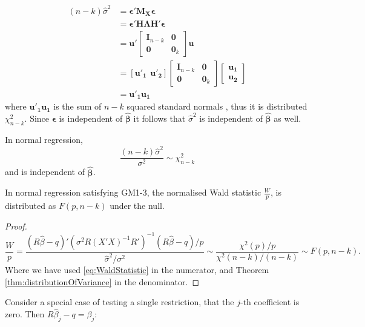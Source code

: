 \documentclass[DIV=14,titlepage=false]{scrreprt}
\begin{document}
\begin{align*}
    (n-k)\hat\sigma^2 &= \boldsymbol{\epsilon}'\mathbf{M_X} \boldsymbol{\epsilon}\\
    &= \boldsymbol{\epsilon}' \mathbf{H}\mathbf{\Lambda} \mathbf{H'} \boldsymbol{\epsilon}\\
    &= \mathbf{u}' \begin{bmatrix}
        \mathbf{I}_{n-k} & \mathbf{0} \\
        \mathbf{0} & \mathbf{0}_k
        \end{bmatrix} \mathbf{u}\\
    &= [\mathbf{u'_1} \hspace{5pt} \mathbf{u'_2}] \begin{bmatrix}
        \mathbf{I}_{n-k} & \mathbf{0} \\
        \mathbf{0} & \mathbf{0}_k
        \end{bmatrix} \begin{bmatrix}
            \mathbf{u_1}\\
            \mathbf{u_2}
        \end{bmatrix}\\
    &=\mathbf{u'_1} \mathbf{u_1}
\end{align*}
where $\mathbf{u'_1} \mathbf{u_1}$ is the sum of $n-k$ squared standard normals , thus it is distributed $\chi^2_{n-k}$. Since $\boldsymbol{\epsilon}$ is independent of $\boldsymbol{\hat\beta}$ it follows that $\hat\sigma^2$ is independent of $\boldsymbol{\hat\beta}$ as well.
\begin{theorem} 
In normal regression, \[\frac{(n-k)\hat\sigma^2}{\sigma^2}\sim\chi^2_{n-k}\] and is independent of $\boldsymbol{\hat\beta}$.
\label{thm:distributionOfVariance}
\end{theorem}
\begin{corollary}
    In normal regression satisfying GM1-3, the normalised Wald statistic $\frac{W}{p}$, is distributed as $F(p,n-k)$ under the null.
\end{corollary}
\begin{proof}
    \[
\frac{W}{p} = \frac{(R \hat\beta-q)'(\sigma^2R(X'X)^{-1}R')^{-1}(R \hat\beta-q)/p}{\hat\sigma^2/\sigma^2} \sim \frac{\chi^2(p)/p}{\chi^2(n - k)/(n - k)} \sim F(p, n - k).
\]
Where we have used \ref{eq:WaldStatistic} in the numerator, and Theorem \ref{thm:distributionOfVariance} in the denominator.
\end{proof}
Consider a special case of testing a single restriction, that the $j$-th coefficient is zero. Then $R\hat \beta_j -q=\beta_j$:
\end{document}
